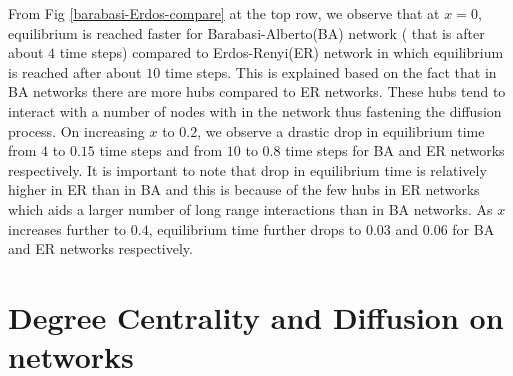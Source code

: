 \documentclass[10pt,a4paper]{article}
\begin{document}
From Fig \ref{barabasi-Erdos-compare} at the top row, we observe that at $x=0$, equilibrium is reached faster for Barabasi-Alberto(BA) network ( that is after about $4$ time steps) compared to Erdos-Renyi(ER) network in which equilibrium is reached after about $10$ time steps. This is explained based on the fact that in BA networks there are more hubs compared to ER networks. These hubs tend to interact with a number of nodes with in the network thus fastening the diffusion process. On increasing $x$ to $0.2$, we observe a drastic drop in equilibrium time from  $4$ to $0.15$ time steps and from $10$ to $0.8$ time steps for BA and ER networks respectively. It is important to note that drop in equilibrium time is relatively higher in ER than in BA and this is because of the few hubs in ER networks which aids a larger number of long range interactions than in BA networks. As $x$ increases further to $0.4$, equilibrium time further drops to $0.03$ and $0.06$ for BA and ER networks respectively.

\section{Degree Centrality and Diffusion on networks}
\end{document}
